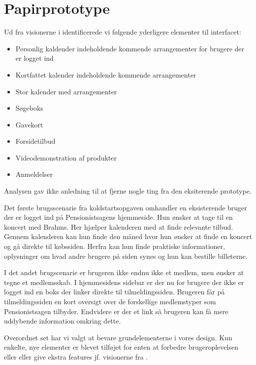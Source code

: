 \section{Papirprototype}

Ud fra visionerne i \cite{os} identificerede vi følgende yderligere
elementer til interfacet:

\begin{itemize}
    \item Personlig kaldender indeholdende kommende arrangementer for brugere der er logget ind
    \item Kortfattet kalender indeholdende kommende arrangementer
    \item Stor kalender med arrangementer
    \item Søgeboks
    \item Gavekort
    \item Forsidetilbud
    \item Videodemonstration af produkter
    \item Anmeldelser
\end{itemize}

Analysen gav ikke anledning til at fjerne nogle ting fra den eksiterende
prototype.

Det første brugsscenarie fra koldstartsopgaven omhandler en eksisterende
bruger der er logget ind på Pensionistsagens hjemmeside. Hun ønsker at tage
til en koncert med Brahms. Her hjælper kalenderen med at finde relevante
tilbud. Gennem kalenderen kan hun finde den måned hvor hun ønsker at finde
en koncert og gå direkte til købssiden. Herfra kan hun finde praktiske
informationer, oplysninger om hvad andre brugere på siden synes og hun kan
bestille billeterne.

I det andet brugscenarie er brugeren ikke endnu ikke et medlem, men ønsker at
tegne et medlemsskab. I hjemmesidens sidebar er der nu for brugere der ikke
er logget ind en boks der linker direkte til tilmeldingssiden. Brugeren får
på tilmeldingssiden en kort oversigt over de forskellige medlemstyper som
Pensionistsagen tilbyder. Endvidere er der et link så brugeren kan få mere
uddybende information omkring dette.

Overordnet set har vi valgt at bevare grundelementerne i vores design.
Kun enkelte, nye elementer er blevet tilføjet for enten at forbedre
brugeroplevelsen eller eller give ekstra features jf. visionerne fra \cite{os}.
